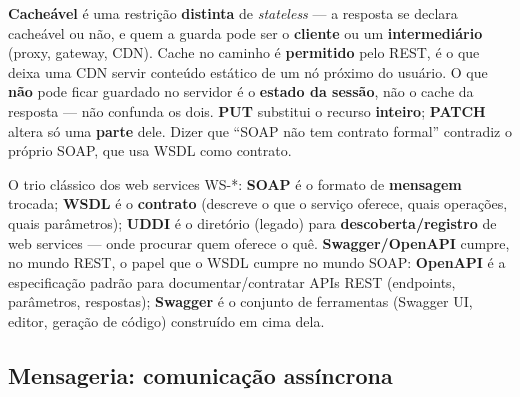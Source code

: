 \begin{cuidado}
\textbf{Cacheável} é uma restrição \textbf{distinta} de \textit{stateless}
--- a resposta se declara cacheável ou não, e quem a guarda pode ser o
\textbf{cliente} ou um \textbf{intermediário} (proxy, gateway, CDN). Cache
no caminho é \textbf{permitido} pelo REST, é o que deixa uma CDN servir
conteúdo estático de um nó próximo do usuário. O que \textbf{não} pode
ficar guardado no servidor é o \textbf{estado da sessão}, não o cache da
resposta --- não confunda os dois. \textbf{PUT} substitui o recurso
\textbf{inteiro}; \textbf{PATCH} altera só uma \textbf{parte} dele. Dizer
que “SOAP não tem contrato formal” contradiz o próprio SOAP, que usa WSDL
como contrato.
\end{cuidado}

\begin{conceito}
O trio clássico dos web services WS-*: \textbf{SOAP} é o formato de
\textbf{mensagem} trocada; \textbf{WSDL} é o \textbf{contrato} (descreve
o que o serviço oferece, quais operações, quais parâmetros); \textbf{UDDI}
é o diretório (legado) para \textbf{descoberta/registro} de web services
--- onde procurar quem oferece o quê. \textbf{Swagger/OpenAPI} cumpre, no
mundo REST, o papel que o WSDL cumpre no mundo SOAP: \textbf{OpenAPI} é a
especificação padrão para documentar/contratar APIs REST (endpoints,
parâmetros, respostas); \textbf{Swagger} é o conjunto de ferramentas
(Swagger UI, editor, geração de código) construído em cima dela.
\end{conceito}

\subsection{Mensageria: comunicação assíncrona}

